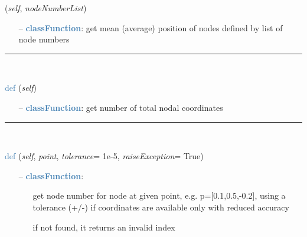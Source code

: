 \begin{itemize}[leftmargin=1.4cm]
\begin{itemize}[leftmargin=0.5cm]
\begin{itemize}[leftmargin=1.4cm]
\begin{itemize}[leftmargin=0.5cm]
\begin{flushleft}
({\it self}, {\it nodeNumberList})
\end{flushleft}
\setlength{\itemindent}{0.7cm}
\begin{itemize}[leftmargin=0.7cm]
  \item[--]  \textcolor{steelblue}{\bf classFunction}: get mean (average) position of nodes defined by list of node numbers\vspace{12pt}\end{itemize}
%
\noindent\rule{8cm}{0.75pt}\vspace{1pt} \\ 
\begin{flushleft}
\noindent \textcolor{steelblue}{def {\bf {}}}\label{sec:FEM:FEMinterface:NumberOfCoordinates}
({\it self})
\end{flushleft}
\setlength{\itemindent}{0.7cm}
\begin{itemize}[leftmargin=0.7cm]
  \item[--]  \textcolor{steelblue}{\bf classFunction}: get number of total nodal coordinates\vspace{12pt}\end{itemize}
%
\noindent\rule{8cm}{0.75pt}\vspace{1pt} \\ 
\begin{flushleft}
\noindent \textcolor{steelblue}{def {\bf {}}}\label{sec:FEM:FEMinterface:GetNodeAtPoint}
({\it self}, {\it point}, {\it tolerance}= 1e-5, {\it raiseException}= True)
\end{flushleft}
\setlength{\itemindent}{0.7cm}
\begin{itemize}[leftmargin=0.7cm]
  \item[--]  \textcolor{steelblue}{\bf classFunction}: \vspace{-6pt}
  \begin{itemize}[leftmargin=1.2cm]
\setlength{\itemindent}{-0.7cm}
    \item[] get node number for node at given point, e.g. p=[0.1,0.5,-0.2], using a tolerance (+/-) if coordinates are available only with reduced accuracy
    \item[] if not found, it returns an invalid index
  \end{itemize}
\vspace{12pt}\end{itemize}

\end{itemize}
\end{itemize}
\end{itemize}
\end{itemize}
